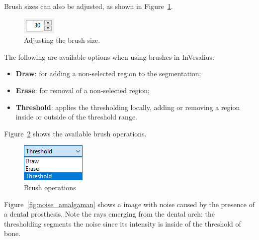 \newpage

Brush sizes can also be adjusted, as shown in Figure~\ref{fig:select_diameter}.

\begin{figure}[!htb]
\centering
\includegraphics[scale=0.8]{../user_guide_figures/invesalius_screen/segmentation_manual_diameter.png}
\caption{Adjusting the brush size.}
\label{fig:select_diameter}
\end{figure}

The following are available options when using brushes in InVesalius:

\begin{itemize}
	\item \textbf{Draw}: for adding a non-selected region to the segmentation;

	\item \textbf{Erase}: for removal of a non-selected region;

	\item \textbf{Threshold}: applies the thresholding locally, adding or removing a region inside or outside of the threshold range.
\end{itemize}

Figure~\ref{fig:select_brush_operations} shows the available brush operations.

\begin{figure}[!htb]
\centering
\includegraphics[scale=0.7]{../user_guide_figures/invesalius_screen/segmentation_manual_pencil_type_operation_type_en.png}
\caption{Brush operations}
\label{fig:select_brush_operations}
\end{figure}

Figure~\ref{fig:noise_amalgaman} shows a image with noise caused by the presence of a dental prosthesis. Note the rays emerging from the dental arch: the thresholding segments the noise since its intensity is inside of the threshold of bone.

